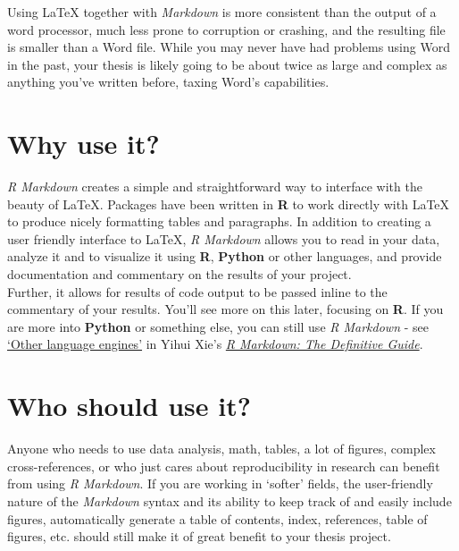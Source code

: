 \documentclass[a4paper, nobind]{templates/iheidthesis}
\newcommand*{\bibtitle}{Bibliography}
\begin{document}
Using LaTeX together with \emph{Markdown} is more consistent than the output of a word processor, much less prone to corruption or crashing, and the resulting file is smaller than a Word file.
While you may never have had problems using Word in the past, your thesis is likely going to be about twice as large and complex as anything you've written before, taxing Word's capabilities.

\hypertarget{why-use-it}{%
\section*{Why use it?}\label{why-use-it}}

\emph{R Markdown} creates a simple and straightforward way to interface with the beauty of LaTeX.
Packages have been written in \textbf{R} to work directly with LaTeX to produce nicely formatting tables and paragraphs.
In addition to creating a user friendly interface to LaTeX, \emph{R Markdown} allows you to read in your data, analyze it and to visualize it using \textbf{R}, \textbf{Python} or other languages, and provide documentation and commentary on the results of your project.\\
Further, it allows for results of code output to be passed inline to the commentary of your results.
You'll see more on this later, focusing on \textbf{R}. If you are more into \textbf{Python} or something else, you can still use \emph{R Markdown} - see \href{https://bookdown.org/yihui/rmarkdown/language-engines.html}{`Other language engines'} in Yihui Xie's \href{https://bookdown.org/yihui/rmarkdown/language-engines.html}{\emph{R Markdown: The Definitive Guide}}.

\hypertarget{who-should-use-it}{%
\section*{Who should use it?}\label{who-should-use-it}}

Anyone who needs to use data analysis, math, tables, a lot of figures, complex cross-references, or who just cares about reproducibility in research can benefit from using \emph{R Markdown}.
If you are working in `softer' fields, the user-friendly nature of the \emph{Markdown} syntax and its ability to keep track of and easily include figures, automatically generate a table of contents, index, references, table of figures, etc. should still make it of great benefit to your thesis project.




\setlength{\baselineskip}{0pt} %

{\renewcommand*\MakeUppercase[1]{#1}%
\printbibliography[heading=bibintoc,title={\bibtitle}]}
\end{document}
